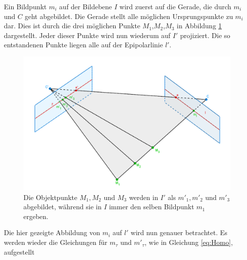 Ein Bildpunkt $m_i$ auf der Bildebene $I$ wird zuerst auf die Gerade, die durch $m_i$ und $C$ geht abgebildet. Die Gerade stellt alle möglichen Ursprungspunkte zu $m_i$ dar. Dies ist durch die drei möglichen Punkte $M_1$,$M_2$,$M_3$ in Abbildung \ref{fig:Epipolarconstraint} dargestellt. Jeder dieser Punkte wird nun wiederum auf $I'$ projiziert. Die so entstandenen Punkte liegen alle auf der Epipolarlinie $l'$\cite{HZ}. 


\begin{figure}[!htb]
	\centering
	\includegraphics[width=.8\linewidth]{images/EpipolarLinien.png}
	\caption[Abbildungsvorschrift]{Die Objektpunkte $M_1, M_2$ und $M_3$ werden in $I'$ als $m'_1, m'_2$ und $m'_3$ abgebildet, während sie in $I$ immer den selben Bildpunkt $m_1$ ergeben.}  
	\label{fig:Epipolarconstraint}
\end{figure}


Die hier gezeigte Abbildung von $m_i$ auf $l'$ wird nun genauer betrachtet. Es werden wieder die Gleichungen für $m_\tau$ und $m'_\tau$, wie in Gleichung \ref{eq:Homo}, aufgestellt    

